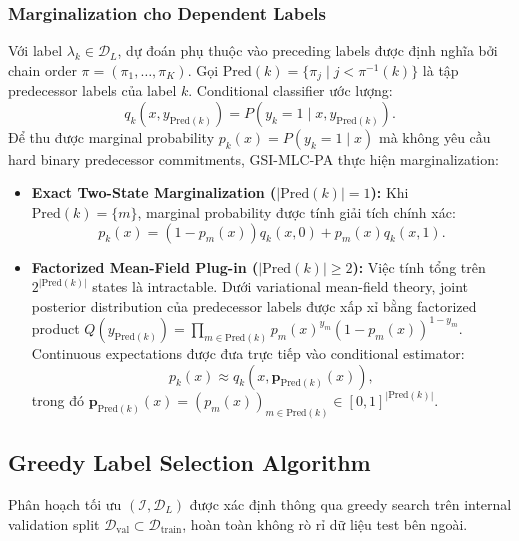 \documentclass[conference]{IEEEtran}
\begin{document}
\subsubsection{Marginalization cho Dependent Labels}
Với label $\lambda_k \in \mathcal{D}_L$, dự đoán phụ thuộc vào preceding labels được định nghĩa bởi chain order $\pi = (\pi_1, \dots, \pi_K)$. Gọi $\text{Pred}(k) = \{\pi_j \mid j < \pi^{-1}(k)\}$ là tập predecessor labels của label $k$. Conditional classifier ước lượng:
\begin{equation}
    q_k(x, y_{\text{Pred}(k)}) = P(y_k = 1 \mid x, y_{\text{Pred}(k)}).
\end{equation}
Để thu được marginal probability $p_k(x) = P(y_k = 1 \mid x)$ mà không yêu cầu hard binary predecessor commitments, GSI-MLC-PA thực hiện marginalization:
\begin{itemize}
    \item \textbf{Exact Two-State Marginalization ($|\text{Pred}(k)| = 1$):} Khi $\text{Pred}(k) = \{m\}$, marginal probability được tính giải tích chính xác:
    \begin{equation}
        p_k(x) = (1 - p_m(x)) q_k(x, 0) + p_m(x) q_k(x, 1).
    \end{equation}
    \item \textbf{Factorized Mean-Field Plug-in ($|\text{Pred}(k)| \ge 2$):} Việc tính tổng trên $2^{|\text{Pred}(k)|}$ states là intractable. Dưới variational mean-field theory, joint posterior distribution của predecessor labels được xấp xỉ bằng factorized product $Q(y_{\text{Pred}(k)}) = \prod_{m \in \text{Pred}(k)} p_m(x)^{y_m} (1 - p_m(x))^{1 - y_m}$. Continuous expectations được đưa trực tiếp vào conditional estimator:
    \begin{equation}
        p_k(x) \approx q_k\left(x, \mathbf{p}_{\text{Pred}(k)}(x)\right),
    \end{equation}
    trong đó $\mathbf{p}_{\text{Pred}(k)}(x) = \left(p_m(x)\right)_{m \in \text{Pred}(k)} \in [0, 1]^{|\text{Pred}(k)|}$.
\end{itemize}

\subsection{Greedy Label Selection Algorithm}
Phân hoạch tối ưu $(\mathcal{I}, \mathcal{D}_L)$ được xác định thông qua greedy search trên internal validation split $\mathcal{D}_{\text{val}} \subset \mathcal{D}_{\text{train}}$, hoàn toàn không rò rỉ dữ liệu test bên ngoài.
\end{document}
